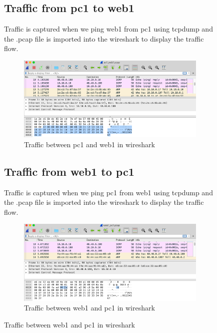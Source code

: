 \begin{figure}[H]
\subsection{Traffic from pc1 to web1}
Traffic is captured when we ping web1 from pc1 using tcpdump and the .pcap file is imported into the wireshark to display the traffic flow.
\begin{figure}[H]
\centering
  \includegraphics[width=400pt]{Images/pc1_web1_tcpdump.png}
  \caption{Traffic between pc1 and web1 in wireshark}
  \label{fig:2.4.1}
\end{figure}
\subsection{Traffic from web1 to pc1}
Traffic is captured when we ping pc1 from web1 using tcpdump and the .pcap file is imported into the wireshark to display the traffic flow.
\begin{figure}[H]
\centering
  \includegraphics[width=400pt]{Images/web1_pc1_tcpdump.png}
  \caption{Traffic between web1 and pc1 in wireshark}
  \label{fig:2.4.2}
\end{figure}

\end{figure}
